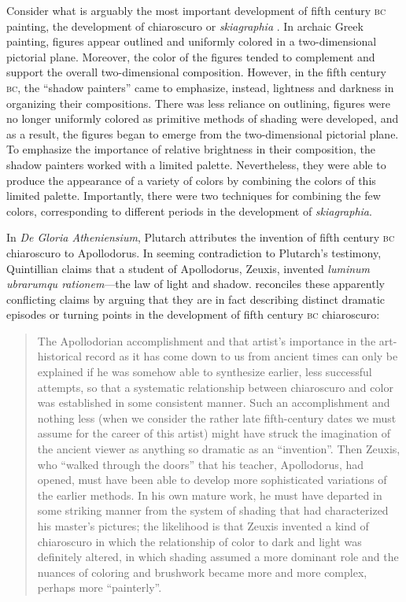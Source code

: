 Consider what is arguably the most important development of fifth century \textsc{bc} painting, the development of chiaroscuro or \emph{skiagraphia} \citep[see][]{Bruno:1977fk,Keuls:1975uq,Pemberton:1976kx}. In archaic Greek painting, figures appear outlined and uniformly colored in a two-dimensional pictorial plane. Moreover, the color of the figures tended to complement and support the overall two-dimensional composition. However, in the fifth century \textsc{bc}, the ``shadow painters'' came to emphasize, instead, lightness and darkness in organizing their compositions. There was less reliance on outlining, figures were no longer uniformly colored as primitive methods of shading were developed, and as a result, the figures began to emerge from the two-dimensional pictorial plane. To emphasize the importance of relative brightness in their composition, the shadow painters worked with a limited palette. Nevertheless, they were able to produce the appearance of a variety of colors by combining the colors of this limited palette. Importantly, there were two techniques for combining the few colors, corresponding to different periods in the development of \emph{skiagraphia}.

In \emph{De Gloria Atheniensium}, Plutarch attributes the invention of fifth century \textsc{bc} chiaroscuro to Apollodorus. In seeming contradiction to Plutarch's testimony, Quintillian claims that a student of Apollodorus, Zeuxis, invented \emph{luminum ubrarumqu rationem}---the law of light and shadow. \citet[27--29]{Bruno:1977fk} reconciles these apparently conflicting claims by arguing that they are in fact describing distinct dramatic episodes or turning points in the development of fifth century \textsc{bc} chiaroscuro:
\begin{quote}
    The Apollodorian accomplishment and that artist's importance in the art-historical record as it has come down to us from ancient times can only be explained if he was somehow able to synthesize earlier, less successful attempts, so that a systematic relationship between chiaroscuro and color was established in some consistent manner. Such an accomplishment and nothing less (when we consider the rather late fifth-century dates we must assume for the career of this artist) might have struck the imagination of the ancient viewer as anything so dramatic as an ``invention''. Then Zeuxis, who ``walked through the doors'' that his teacher, Apollodorus, had opened, must have been able to develop more sophisticated variations of the earlier methods. In his own mature work, he must have departed in some striking manner from the system of shading that had characterized his master's pictures; the likelihood is that Zeuxis invented a kind of chiaroscuro in which the relationship of color to dark and light was definitely altered, in which shading assumed a more dominant role and the nuances of coloring and brushwork became more and more complex, perhaps more ``painterly''. \citep[29]{Bruno:1977fk}
\end{quote}

